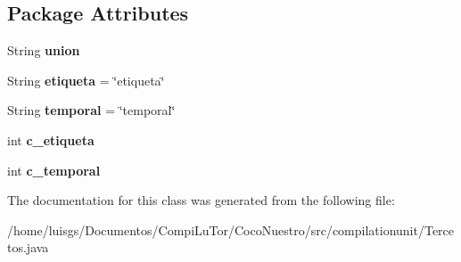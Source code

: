 \subsection*{Package Attributes}
\begin{DoxyCompactItemize}
\item 
\hypertarget{classcompilationunit_1_1_tercetos_a61d10f91cbc75571f939521ea098d6a8}{
String {\bfseries union}}
\label{classcompilationunit_1_1_tercetos_a61d10f91cbc75571f939521ea098d6a8}

\item 
\hypertarget{classcompilationunit_1_1_tercetos_af3b976c23d4f086fcbc038d079e1515f}{
String {\bfseries etiqueta} = \char`\"{}etiqueta\char`\"{}}
\label{classcompilationunit_1_1_tercetos_af3b976c23d4f086fcbc038d079e1515f}

\item 
\hypertarget{classcompilationunit_1_1_tercetos_a3549b28cd5de3d82c6289ba01de90165}{
String {\bfseries temporal} = \char`\"{}temporal\char`\"{}}
\label{classcompilationunit_1_1_tercetos_a3549b28cd5de3d82c6289ba01de90165}

\item 
\hypertarget{classcompilationunit_1_1_tercetos_a3795738c55517f9900a0f700dbb8c952}{
int {\bfseries c\_\-etiqueta}}
\label{classcompilationunit_1_1_tercetos_a3795738c55517f9900a0f700dbb8c952}

\item 
\hypertarget{classcompilationunit_1_1_tercetos_aa76dc5737f466cd03d520f2576fc072d}{
int {\bfseries c\_\-temporal}}
\label{classcompilationunit_1_1_tercetos_aa76dc5737f466cd03d520f2576fc072d}

\end{DoxyCompactItemize}


The documentation for this class was generated from the following file:\begin{DoxyCompactItemize}
\item 
/home/luisgs/Documentos/CompiLuTor/CocoNuestro/src/compilationunit/Tercetos.java\end{DoxyCompactItemize}
